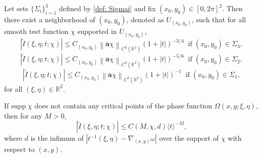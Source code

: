 \documentclass[10pt,a4paper]{amsart}
\newcommand\JP[1]{\langle#1\rangle}
\newcommand\norm[1]{\left\|#1\right\|}
\newcommand{\R}{\mathbb{R}}
\begin{document}
\begin{corollary}\label{coro: decomposition of torus}
    Let sets $\{\Sigma_{i}\}_{i=1}^{3}$ defined by \eqref{def: Sigmai} and fix $\left(x_{0},y_{0}\right)\in\left[0,2\pi\right]^{2}$. Then there exist a neighborhood of $\left(x_{0},y_{0}\right)$, denoted as $U_{\left(x_{0},y_{0}\right)}$, such that for all smooth test function $\chi$ supported in $U_{\left(x_{0},y_{0}\right)}$,
    \begin{equation}
        \left|\widetilde{I}\left(\xi,\eta;t;\chi\right)\right|\leq C_{\left(x_{0},y_{0}\right)}\norm{\mathbf{a}\chi}_{C^{3}\left(\R^{2}\right)}\left(1+\left|t\right|\right)^{-3/4}\;\;\mathrm{if}\;\left(x_{0},y_{0}\right)\in \Sigma_{3},
    \end{equation}
    \begin{equation}
        \left|\widetilde{I}\left(\xi,\eta;t;\chi\right)\right|\leq C_{\left(x_{0},y_{0}\right)}\norm{\mathbf{a}\chi}_{C^{3}\left(\R^{2}\right)}\left(1+\left|t\right|\right)^{-5/6}\;\;\mathrm{if}\;\left(x_{0},y_{0}\right)\in \Sigma_{2},
    \end{equation}
    \begin{equation}
        \left|\widetilde{I}\left(\xi,\eta;t;\chi\right)\right|\leq C_{\left(x_{0},y_{0}\right)}\norm{\mathbf{a}\chi}_{C^{3}\left(\R^{2}\right)}\left(1+\left|t\right|\right)^{-1}\;\;\mathrm{if}\;\left(x_{0},y_{0}\right)\in \Sigma_{1},
    \end{equation}
    for all $\left(\xi,\eta\right)\in\R^{2}$.
\end{corollary}

\begin{proposition}\label{prop:fast decay}
     If $\mathrm{supp}\;\chi$ does not contain any critical points of the phase function $\Omega\left(x,y;\xi,\eta\right)$, then for any $M>0$,
    \begin{equation*}
        \left|\widetilde{I}\left(\xi,\eta;t;\chi\right)\right|\leq C\left(M,\chi,d\right)\JP{t}^{-M},
    \end{equation*}
    where $d$ is the infimum of $\left|t^{-1}\left(\xi,\eta\right)-\nabla_{\left(x,y\right)}\omega\right|$ over the support of $\chi$ with respect to $\left(x,y\right)$.
\end{proposition}
\end{document}
